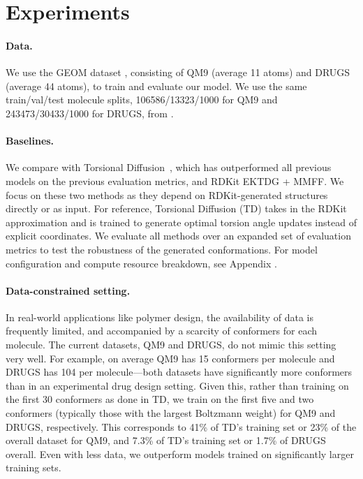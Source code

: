 \section{Experiments}
\vspace{-1ex}
\paragraph{Data.} We use the GEOM dataset \citep{GEOM}, consisting of QM9 (average 11 atoms) and DRUGS (average 44 atoms), to train and evaluate our model. 
We use the same train/val/test molecule splits, 106586/13323/1000 for
QM9 and 243473/30433/1000 for DRUGS, from \citet{GeoMol}. 

\vspace{-1ex}
\paragraph{Baselines.} We compare with Torsional Diffusion~\citep{torsional-diffusion}, which has outperformed all previous models on the previous evaluation metrics, and RDKit EKTDG + MMFF. We focus on these two methods as they depend on RDKit-generated structures directly or as input. 
For reference, Torsional Diffusion (TD) takes in the RDKit approximation and is trained to generate optimal torsion angle updates instead of explicit coordinates. 
We evaluate all methods over an expanded set of evaluation metrics to test the robustness of the generated conformations. 
For \model model configuration and compute resource breakdown, see Appendix . 

\vspace{-1ex}
\paragraph{Data-constrained setting.} In real-world applications like polymer design, the availability of data is frequently limited, and accompanied by a scarcity of conformers for each molecule. The current datasets, QM9 and DRUGS, do not mimic this setting very well. For example, on average QM9 has 15 conformers per molecule and DRUGS has 104 per molecule---both datasets have significantly more conformers than in an experimental drug design setting. Given this, rather than training on the first 30 conformers as done in TD, we train on the first five and two conformers (typically those with the largest Boltzmann weight) for QM9 and DRUGS, respectively. This corresponds to 41\% of TD's training set or 23\% of the overall dataset for QM9, and 7.3\% of TD's training set or 1.7\% of DRUGS overall.
Even with less data, we outperform models trained on significantly larger training sets.


